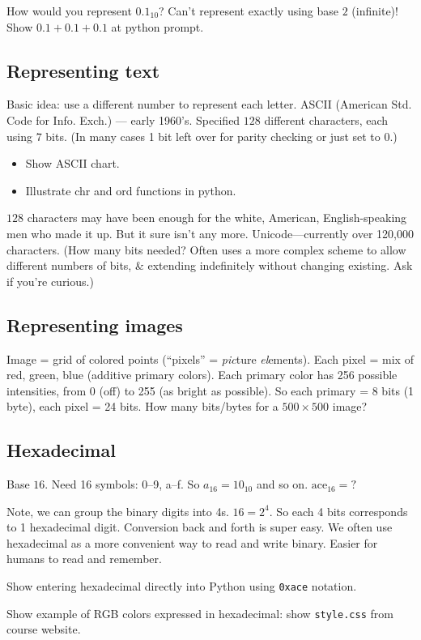 \documentclass{article}
\begin{document}
How would you represent $0.1_{10}$?  Can't represent exactly using
base $2$ (infinite)! Show $0.1 + 0.1 + 0.1$ at python prompt.

\subsection*{Representing text}

Basic idea: use a different number to represent each letter.  ASCII
(American Std. Code for Info. Exch.) --- early 1960's.  Specified
$128$ different characters, each using $7$ bits.  (In many cases 1 bit
left over for parity checking or just set to $0$.)
\begin{itemize}
\item Show ASCII chart.
\item Illustrate chr and ord functions in python.
\end{itemize}
$128$ characters may have been enough for the white, American,
English-speaking men who made it up.  But it sure isn't any more.
Unicode---currently over 120,000 characters. (How many bits needed?
Often uses a more complex scheme to allow different numbers of bits,
\& extending indefinitely without changing existing.  Ask if you're
curious.)

\subsection*{Representing images}

Image = grid of colored points (``pixels'' = \emph{pic}ture
\emph{el}ements).  Each pixel = mix of red, green, blue (additive
primary colors).  Each primary color has 256 possible intensities,
from 0 (off) to 255 (as bright as possible).  So each primary = 8 bits
(1 byte), each pixel = 24 bits.  How many bits/bytes for a $500 \times
500$ image?

\subsection*{Hexadecimal}

Base $16$.  Need 16 symbols: 0--9, a--f. So $a_{16} = 10_{10}$ and so
on. $\mbox{ace}_{16} = ?$

Note, we can group the binary digits into 4s.  $16 = 2^4$.  So each 4
bits corresponds to 1 hexadecimal digit.  Conversion back and forth is
super easy.  We often use hexadecimal as a more convenient way to read
and write binary.  Easier for humans to read and remember.

Show entering hexadecimal directly into Python using \verb|0xace|
notation.

Show example of RGB colors expressed in hexadecimal: show
\verb|style.css| from course website.
\end{document}
